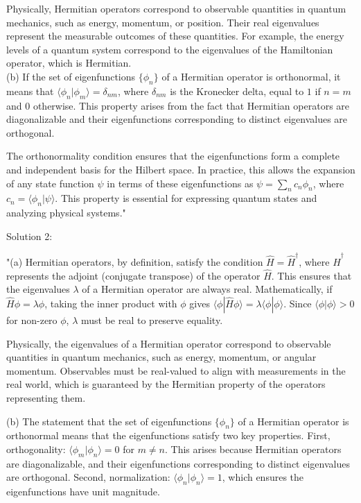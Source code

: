 Physically, Hermitian operators correspond to observable quantities in quantum mechanics, such as energy, momentum, or position. Their real eigenvalues represent the measurable outcomes of these quantities. For example, the energy levels of a quantum system correspond to the eigenvalues of the Hamiltonian operator, which is Hermitian. \\

(b) If the set of eigenfunctions $\{\phi_n\}$ of a Hermitian operator is orthonormal, it means that $\langle \phi_n | \phi_m \rangle = \delta_{nm}$, where $\delta_{nm}$ is the Kronecker delta, equal to $1$ if $n = m$ and $0$ otherwise. This property arises from the fact that Hermitian operators are diagonalizable and their eigenfunctions corresponding to distinct eigenvalues are orthogonal. 

The orthonormality condition ensures that the eigenfunctions form a complete and independent basis for the Hilbert space. In practice, this allows the expansion of any state function $\psi$ in terms of these eigenfunctions as $\psi = \sum_n c_n \phi_n$, where $c_n = \langle \phi_n | \psi \rangle$. This property is essential for expressing quantum states and analyzing physical systems."

Solution 2: 

"(a) Hermitian operators, by definition, satisfy the condition $\hat{H} = \hat{H}^\dagger$, where $\hat{H}^\dagger$ represents the adjoint (conjugate transpose) of the operator $\hat{H}$. This ensures that the eigenvalues $\lambda$ of a Hermitian operator are always real. Mathematically, if $\hat{H} \phi = \lambda \phi$, taking the inner product with $\phi$ gives $\langle \phi | \hat{H} \phi \rangle = \lambda \langle \phi | \phi \rangle$. Since $\langle \phi | \phi \rangle > 0$ for non-zero $\phi$, $\lambda$ must be real to preserve equality. 

Physically, the eigenvalues of a Hermitian operator correspond to observable quantities in quantum mechanics, such as energy, momentum, or angular momentum. Observables must be real-valued to align with measurements in the real world, which is guaranteed by the Hermitian property of the operators representing them.

(b) The statement that the set of eigenfunctions $\{\phi_n\}$ of a Hermitian operator is orthonormal means that the eigenfunctions satisfy two key properties. First, orthogonality: $\langle \phi_m | \phi_n \rangle = 0$ for $m \neq n$. This arises because Hermitian operators are diagonalizable, and their eigenfunctions corresponding to distinct eigenvalues are orthogonal. Second, normalization: $\langle \phi_n | \phi_n \rangle = 1$, which ensures the eigenfunctions have unit magnitude. 

